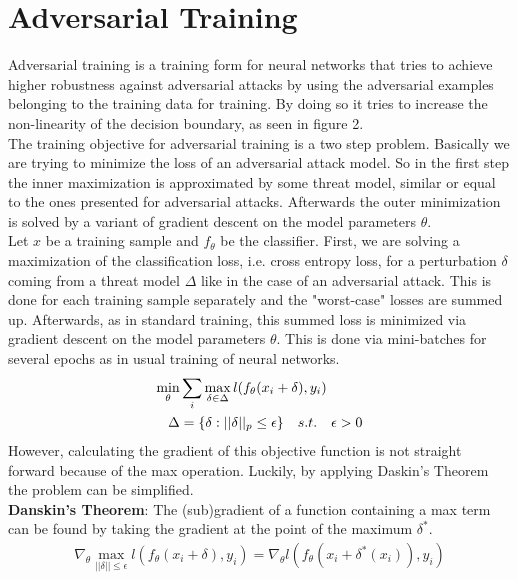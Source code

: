 \documentclass[conference]{IEEEtran}
\begin{document}
\section{Adversarial Training}

Adversarial training is a training form for neural networks that tries to achieve higher robustness against adversarial attacks by using the adversarial examples belonging to the training data for training. By doing so it tries to increase the non-linearity of the decision boundary, as seen in figure 2. \\
The training objective for adversarial training is a two step problem. Basically we are trying to minimize the loss of an adversarial attack model. So in the first step the inner maximization is approximated by some threat model, similar or equal to the ones presented for adversarial attacks. Afterwards the outer minimization is solved by a variant of gradient descent on the model parameters $\theta$. \\
Let $x$ be a training sample and $f_{\theta}$ be the classifier. First, we are solving a maximization of the classification loss, i.e. cross entropy loss, for a perturbation $\delta$ coming from a threat model $\Delta$ like in the case of an adversarial attack. This is done for each training sample separately and the "worst-case" losses are summed up. Afterwards, as in standard training, this summed loss is minimized via gradient descent on the model parameters $\theta$. This is done via mini-batches for several epochs as in usual training of neural networks.
\begin{align*}
  \min_{\theta} & \sum_i \max_{\delta \in \Delta} \space l(f_{\theta}(x_i + \delta), y_i)  \\
\Delta & = \{\delta : ||\delta||_p \leq \epsilon\} \quad s.t. \quad \epsilon > 0
\end{align*}
However, calculating the gradient of this objective function is not straight forward because of the max operation. Luckily, by applying Daskin's Theorem the problem can be simplified. \\

\textbf{Danskin's Theorem}: The (sub)gradient of a function containing a max term can be found by taking the gradient at the point of the maximum $\delta^{*}$.
\begin{align*}
  \nabla_{\theta} \max_{||\delta|| \leq \epsilon} l(f_{\theta}(x_i + \delta), y_i) = \nabla_{\theta} l(f_{\theta}(x_i + \delta^{*}(x_i)), y_i)
\end{align*}
\end{document}
